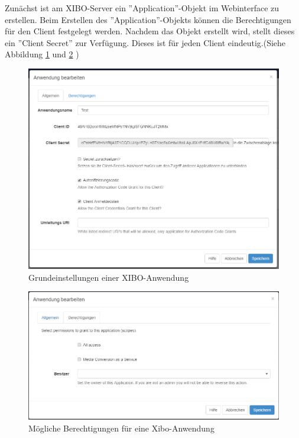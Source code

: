 Zunächst ist am XIBO-Server ein ''Application''-Objekt im Webinterface zu erstellen. Beim Erstellen des ''Application''-Objekts können die Berechtigungen für den Client festgelegt werden. Nachdem das Objekt erstellt wird, stellt dieses ein ''Client Secret'' zur Verfügung. Dieses ist für jeden Client eindeutig.(Siehe Abbildung \ref{fig:base} und \ref{fig:permis} )
\begin{figure}[H]
\centering
\includegraphics[width=1.0\textwidth]{images/03_XIBO-Server/03_EditApplikation}
\caption{Grundeinstellungen einer XIBO-Anwendung}
\label{fig:base}
\end{figure}
\begin{figure}[H]
\centering
\includegraphics[width=1.0\textwidth]{images/03_XIBO-Server/03_ApplikationPermission}
\caption{Mögliche Berechtigungen für eine Xibo-Anwendung}
\label{fig:permis}
\end{figure}

